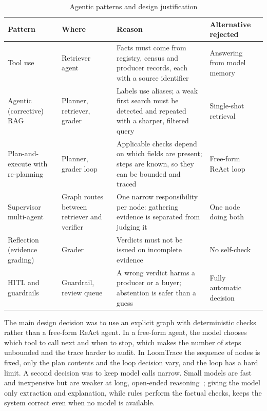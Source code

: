 \begin{table}[H]
\centering
\caption{Agentic patterns and design justification}
\label{tab:patterns}
\small
\begin{tabularx}{\linewidth}{@{}>{\raggedright\arraybackslash}p{2.4cm} >{\raggedright\arraybackslash}p{2.4cm} >{\raggedright\arraybackslash}X >{\raggedright\arraybackslash}p{3.0cm}@{}}
\toprule
\textbf{Pattern} & \textbf{Where} & \textbf{Reason} & \textbf{Alternative rejected} \\ \midrule
Tool use & Retriever agent & Facts must come from registry, census and producer records, each with a source identifier & Answering from model memory \\
Agentic (corrective) RAG & Planner, retriever, grader & Labels use aliases; a weak first search must be detected and repeated with a sharper, filtered query~\cite{yan2024crag} & Single-shot retrieval \\
Plan-and-execute with re-planning & Planner, grader loop & Applicable checks depend on which fields are present; steps are known, so they can be bounded and traced~\cite{wang2023plansolve} & Free-form ReAct loop~\cite{yao2023react} \\
Supervisor multi-agent & Graph routes between retriever and verifier & One narrow responsibility per node: gathering evidence is separated from judging it & One node doing both \\
Reflection (evidence grading) & Grader & Verdicts must not be issued on incomplete evidence~\cite{shinn2023reflexion} & No self-check \\
HITL and guardrails & Guardrail, review queue & A wrong verdict harms a producer or a buyer; abstention is safer than a guess & Fully automatic decision \\
\bottomrule
\end{tabularx}
\end{table}

The main design decision was to use an explicit graph with deterministic checks rather than a
free-form ReAct agent. In a free-form agent, the model chooses which tool to call next and when to stop,
which makes the number of steps unbounded and the trace harder to audit. In LoomTrace the sequence of
nodes is fixed, only the plan contents and the loop decision vary, and the loop has a hard limit. A
second decision was to keep model calls narrow. Small models are fast and inexpensive but are weaker at
long, open-ended reasoning~\cite{liu2024lost}; giving the model only extraction and explanation, while
rules perform the factual checks, keeps the system correct even when no model is available.

